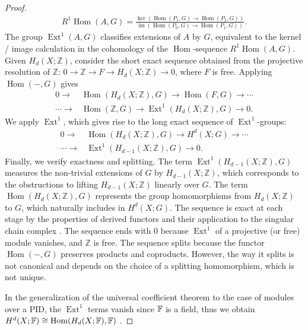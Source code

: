 \begin{proof}
\begin{align}
R^{1} \operatorname{Hom}(A, G) = \frac{\ker(\operatorname{Hom}(P_{1}, G) \to \operatorname{Hom}(P_{2}, G))}{\operatorname{im}(\operatorname{Hom}(P_{0}, G) \to \operatorname{Hom}(P_{1}, G))}.
\end{align}
The group $\operatorname{Ext}^{1}(A, G)$ classifies extensions of $A$ by $G$, equivalent to the kernel / image calculation in the cohomology of the $\operatorname{Hom}$-sequence $R^{1} \operatorname{Hom}(A, G)$. Given $H_{d}(X; \mathbb{Z})$, consider the short exact sequence obtained from the projective resolution of $\mathbb{Z}$: $0 \rightarrow \mathbb{Z} \rightarrow F \rightarrow H_{d}(X; \mathbb{Z}) \rightarrow 0$, where $F$ is free. Applying $\operatorname{Hom}(-, G)$ gives
\begin{align}
0 \rightarrow &\operatorname{Hom}(H_{d}(X; \mathbb{Z}), G) \rightarrow \operatorname{Hom}(F, G) \rightarrow \cdots \nonumber\\
\cdots \rightarrow &\operatorname{Hom}(\mathbb{Z}, G) \rightarrow \operatorname{Ext}^{1}(H_{d}(X; \mathbb{Z}), G) \rightarrow 0.
\end{align}
We apply $\operatorname{Ext}^{1}$, which gives rise to the long exact sequence of $\operatorname{Ext}^1$-groups:
\begin{align}
0 \rightarrow &\operatorname{Hom}(H_{d}(X; \mathbb{Z}), G) \rightarrow H^{d}(X; G) \rightarrow \cdots \nonumber\\
\cdots \rightarrow &\operatorname{Ext}^{1}(H_{d-1}(X; \mathbb{Z}), G) \rightarrow 0.
\end{align}
Finally, we verify exactness and splitting. The term $\operatorname{Ext}^{1}(H_{d-1}(X; \mathbb{Z}), G)$ measures the non-trivial extensions of $G$ by $H_{d-1}(X; \mathbb{Z})$, which corresponds to the obstructions to lifting $H_{d-1}(X; \mathbb{Z})$ linearly over $G$. The term $\operatorname{Hom}(H_{d}(X; \mathbb{Z}), G)$ represents the group homomorphisms from $H_{d}(X; \mathbb{Z})$ to $G$, which naturally includes in $H^{d}(X; G)$. The sequence is exact at each stage by the properties of derived functors and their application to the singular chain complex \cite[Horseshoe Lemma 2.2.8]{Weibel1994}. The sequence ends with $0$ because $\operatorname{Ext}^{1}$ of a projective (or free) module vanishes, and $\mathbb{Z}$ is free. The sequence splits because the functor $\operatorname{Hom}(-, G)$ preserves products and coproducts. However, the way it splits is not canonical and depends on the choice of a splitting homomorphism, which is not unique.

In the generalization of the universal coefficient theorem to the case of modules over a PID, the $\operatorname{Ext}^{1}$ terms vanish since ${\mathbb{F}}$ is a field, thus we obtain $H^{d}(X;{\mathbb{F}}) \cong \operatorname{Hom}(H_{d}(X;{\mathbb{F}}),{\mathbb{F}})$ \cite[\S 3.3.1, p. 198]{hatcher2005algebraic}.
\end{proof}

